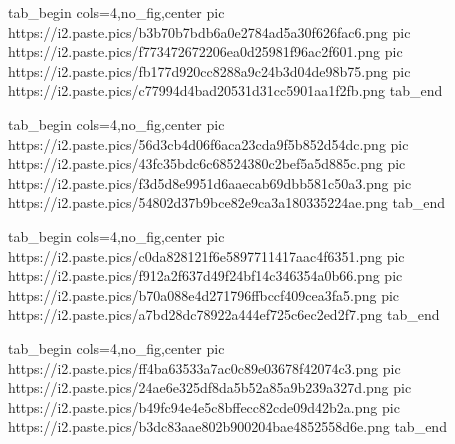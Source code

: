  
 
 
 
 
\zzSecCmtScr

\ifcmt
  tab_begin cols=4,no_fig,center
     pic https://i2.paste.pics/b3b70b7bdb6a0e2784ad5a30f626fac6.png
     pic https://i2.paste.pics/f773472672206ea0d25981f96ac2f601.png
     pic https://i2.paste.pics/fb177d920cc8288a9c24b3d04de98b75.png
     pic https://i2.paste.pics/c77994d4bad20531d31cc5901aa1f2fb.png
  tab_end
\fi

\ifcmt
  tab_begin cols=4,no_fig,center
     pic https://i2.paste.pics/56d3cb4d06f6aca23cda9f5b852d54dc.png
     pic https://i2.paste.pics/43fc35bdc6c68524380c2bef5a5d885c.png
     pic https://i2.paste.pics/f3d5d8e9951d6aaecab69dbb581c50a3.png
     pic https://i2.paste.pics/54802d37b9bce82e9ca3a180335224ae.png
  tab_end
\fi

\ifcmt
  tab_begin cols=4,no_fig,center
    pic https://i2.paste.pics/c0da828121f6e5897711417aac4f6351.png
    pic https://i2.paste.pics/f912a2f637d49f24bf14c346354a0b66.png
    pic https://i2.paste.pics/b70a088e4d271796ffbccf409cea3fa5.png
    pic https://i2.paste.pics/a7bd28dc78922a444ef725c6ec2ed2f7.png
  tab_end
\fi

\ifcmt
  tab_begin cols=4,no_fig,center
     pic https://i2.paste.pics/ff4ba63533a7ac0c89e03678f42074c3.png
     pic https://i2.paste.pics/24ae6e325df8da5b52a85a9b239a327d.png
     pic https://i2.paste.pics/b49fc94e4e5c8bffecc82cde09d42b2a.png
     pic https://i2.paste.pics/b3dc83aae802b900204bae4852558d6e.png
  tab_end
\fi
